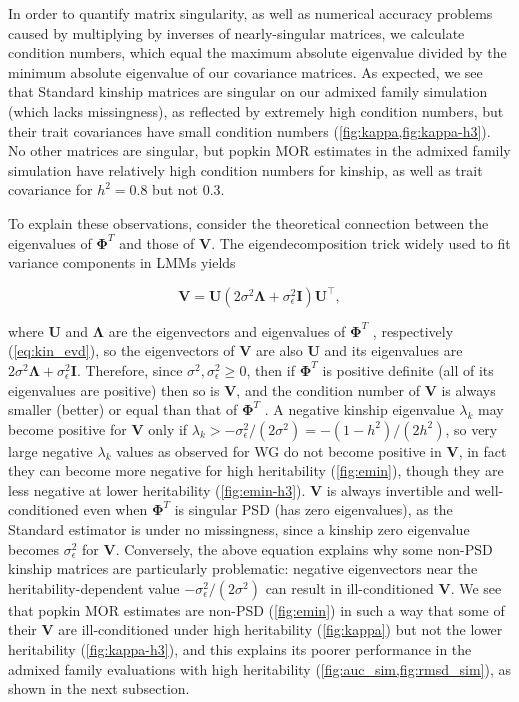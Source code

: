 \documentclass[11pt]{article}
\newcommand{\kinMat}[1][T]{%
  \ensuremath{%
    \mathbf{\Phi}^{#1}
  }%
  \xspace%
}%
\begin{document}
\begin{linenumbers}
In order to quantify matrix singularity, as well as numerical accuracy problems caused by multiplying by inverses of nearly-singular matrices, we calculate condition numbers, which equal the maximum absolute eigenvalue divided by the minimum absolute eigenvalue of our covariance matrices.
As expected, we see that Standard kinship matrices are singular on our admixed family simulation (which lacks missingness), as reflected by extremely high condition numbers, but their trait covariances have small condition numbers (\cref{fig:kappa,fig:kappa-h3}).
No other matrices are singular, but popkin MOR estimates in the admixed family simulation have relatively high condition numbers for kinship, as well as trait covariance for $h^2=0.8$ but not 0.3.

To explain these observations, consider the theoretical connection between the eigenvalues of \kinMat and those of $\mathbf{V}$.
The eigendecomposition trick widely used to fit variance components in LMMs \citep{kang_efficient_2008, lippert_fast_2011, svishcheva_rapid_2012, zhou_genome-wide_2012, sul_population_2018} yields
\begin{linenomath*}
$$
\mathbf{V} = \mathbf{U} \left( 2 \sigma^2 \mathbf{\Lambda} + \sigma^2_\epsilon \mathbf{I} \right) \mathbf{U}^\intercal,
$$
\end{linenomath*}
where $\mathbf{U}$ and $\mathbf{\Lambda}$ are the eigenvectors and eigenvalues of \kinMat, respectively (\cref{eq:kin_evd}),
so the eigenvectors of $\mathbf{V}$ are also $\mathbf{U}$ and its eigenvalues are $2 \sigma^2 \mathbf{\Lambda} + \sigma^2_\epsilon \mathbf{I}$.
Therefore, since $\sigma^2, \sigma^2_\epsilon \ge 0$, then if \kinMat is positive definite (all of its eigenvalues are positive) then so is $\mathbf{V}$, and the condition number of $\mathbf{V}$ is always smaller (better) or equal than that of \kinMat.
A negative kinship eigenvalue $\lambda_k$ may become positive for $\mathbf{V}$ only if $\lambda_k  > -\sigma^2_\epsilon/(2\sigma^2) = -(1-h^2)/(2h^2)$, so very large negative $\lambda_k$ values as observed for WG do not become positive in $\mathbf{V}$, in fact they can become more negative for high heritability (\cref{fig:emin}), though they are less negative at lower heritability (\cref{fig:emin-h3}).
$\mathbf{V}$ is always invertible and well-conditioned even when \kinMat is singular PSD (has zero eigenvalues), as the Standard estimator is under no missingness, since a kinship zero eigenvalue becomes $\sigma^2_\epsilon$ for $\mathbf{V}$.
Conversely, the above equation explains why some non-PSD kinship matrices are particularly problematic: negative eigenvectors near the heritability-dependent value $-\sigma^2_\epsilon/(2\sigma^2)$ can result in ill-conditioned $\mathbf{V}$.
We see that popkin MOR estimates are non-PSD (\cref{fig:emin}) in such a way that some of their $\mathbf{V}$ are ill-conditioned under high heritability (\cref{fig:kappa}) but not the lower heritability (\cref{fig:kappa-h3}), and this explains its poorer performance in the admixed family evaluations with high heritability (\cref{fig:auc_sim,fig:rmsd_sim}), as shown in the next subsection.


\end{linenumbers}
\end{document}
